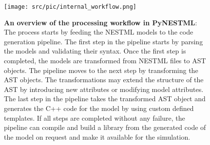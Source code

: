 \begin{figure}[ht!]
\centering
\texttt{[image: src/pic/internal\_workflow.png]}
\caption{\textbf{An overview of the processing workflow in PyNESTML}: The process starts by feeding the NESTML models to the code generation pipeline. The first step in the pipeline starts by parsing the models and validating their syntax. Once the first step is completed, the models are transformed from NESTML files to AST objects. The pipeline moves to the next step by transforming the AST objects. The transformations may extend the structure of the AST by introducing new attributes or modifying model attributes. The last step in the pipeline takes the transformed AST object and generates the C++ code for the model by using custom defined templates. If all steps are completed without any failure, the pipeline can compile and build a library from the generated code of the model on request and make it available for the simulation.}
\label{fig:pynestml_workflow}
\end{figure}



\cleardoublepage

